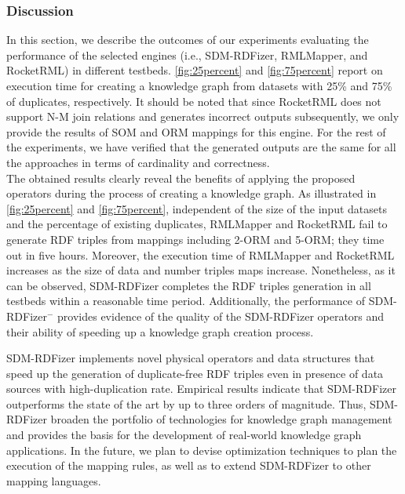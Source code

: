 \subsubsection{Discussion}
In this section, we describe the outcomes of our experiments evaluating the performance of the selected engines (i.e., SDM-RDFizer, RMLMapper, and RocketRML) in different testbeds.
\autoref{fig:25percent} and \autoref{fig:75percent} report on execution time for creating a knowledge graph from datasets with 25\% and 75\% of duplicates, respectively. It should be noted that since RocketRML does not support N-M join relations and generates incorrect outputs subsequently, we only provide the results of SOM and ORM mappings for this engine. For the rest of the experiments, we have verified that the generated outputs are the same for all the approaches in terms of cardinality and correctness.\\
\noindent The obtained results clearly reveal the benefits of applying the proposed operators during the process of creating a knowledge graph. As illustrated in \autoref{fig:25percent} and \autoref{fig:75percent}, independent of the size of the input datasets and the percentage of existing duplicates, RMLMapper and RocketRML fail to generate RDF triples from mappings including 2-ORM and 5-ORM; they time out in five hours. Moreover, the execution time of RMLMapper and RocketRML increases as the size of data and number triples maps increase. Nonetheless, as it can be observed, SDM-RDFizer completes the RDF triples generation in all testbeds within a reasonable time period. Additionally, the performance of SDM-RDFizer$^-$ provides evidence of the quality of the SDM-RDFizer operators and their ability of speeding up a knowledge graph creation process.       

SDM-RDFizer implements novel physical operators and data structures that speed up the generation of duplicate-free RDF triples even in presence of data sources with high-duplication rate. Empirical results indicate that SDM-RDFizer outperforms the state of the art by up to three orders of magnitude. Thus, SDM-RDFizer broaden the portfolio of technologies for knowledge graph management and provides the basis for the development of real-world knowledge graph applications. In the future, we plan to devise optimization techniques to plan the execution of the mapping rules, as well as to extend SDM-RDFizer to other mapping languages.